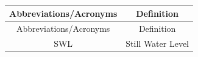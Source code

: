 \makeatletter
    \setlength{\absparsep}{18pt}
\makeatother

\begin{center}
    \textbf{\acrotitle}
\end{center}
\vspace{.5cm}

\begin{longtable}{cc}

\hline
Abbreviations/Acronyms & Definition\\
\hline
\endfirsthead

\hline
Abbreviations/Acronyms & Definition\\
\hline
\endhead

\hline
\endfoot

\hline
\endlastfoot
    SWL & Still Water Level
\end{longtable}
\setcounter{table}{0}